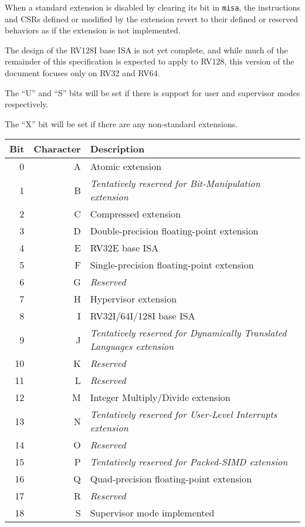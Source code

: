 When a standard extension is disabled by clearing its bit in {\tt misa}, the instructions and CSRs defined or modified by the extension revert to their defined or reserved behaviors as if the extension is not implemented.

The design of the RV128I base ISA is not yet complete, and while much of the remainder of this
specification is expected to apply to RV128, this version of the document
focuses only on RV32 and RV64.

The ``U'' and ``S'' bits will be set if there is support for user and
supervisor modes respectively.

The ``X'' bit will be set if there are any non-standard extensions.

\begin{table*}
\begin{center}
\begin{tabular}{|r|r|l|}
\hline
Bit & Character  & Description \\
\hline
  0 & A & Atomic extension \\
  1 & B & {\em Tentatively reserved for Bit-Manipulation extension} \\
  2 & C & Compressed extension \\
  3 & D & Double-precision floating-point extension \\
  4 & E & RV32E base ISA \\
  5 & F & Single-precision floating-point extension \\
  6 & G & {\em Reserved} \\
  7 & H & Hypervisor extension \\
  8 & I & RV32I/64I/128I base ISA \\
  9 & J & {\em Tentatively reserved for Dynamically Translated Languages extension} \\
 10 & K & {\em Reserved} \\
 11 & L & {\em Reserved} \\
 12 & M & Integer Multiply/Divide extension \\
 13 & N & {\em Tentatively reserved for User-Level Interrupts extension} \\
 14 & O & {\em Reserved} \\
 15 & P & {\em Tentatively reserved for Packed-SIMD extension} \\
 16 & Q & Quad-precision floating-point extension \\
 17 & R & {\em Reserved} \\
 18 & S & Supervisor mode implemented \\

\end{tabular}
\end{center}
\end{table*}
